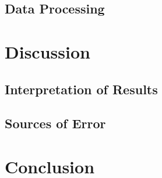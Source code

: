 \subsection{Data Processing}

\section{Discussion}

\subsection{Interpretation of Results}

\subsection{Sources of Error}

\section{Conclusion}
